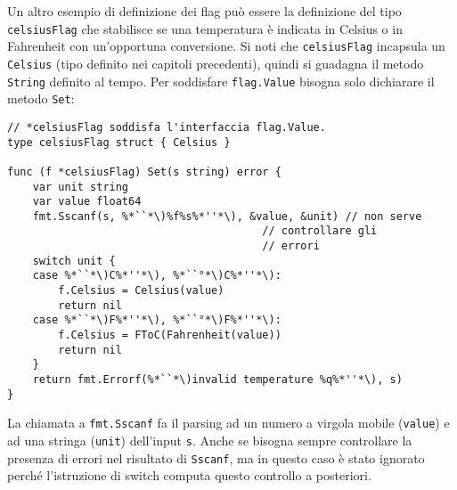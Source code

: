 Un altro esempio di definizione dei flag può essere la definizione del tipo \verb|celsiusFlag| che stabilisce se una temperatura è indicata in Celsius o in Fahrenheit con un'opportuna conversione.
Si noti che \verb|celsiusFlag| incapsula un \verb|Celsius| (tipo definito nei capitoli precedenti), quindi si guadagna il metodo \verb|String| definito al tempo.
Per soddisfare \verb|flag.Value| bisogna solo dichiarare il metodo \verb|Set|:
\begin{lstlisting}[frame=single, label={lst:lstlisting6-4.5}]
// *celsiusFlag soddisfa l'interfaccia flag.Value.
type celsiusFlag struct { Celsius }

func (f *celsiusFlag) Set(s string) error {
    var unit string
    var value float64
    fmt.Sscanf(s, %*``*\)%f%s%*''*\), &value, &unit) // non serve
                                        // controllare gli
                                        // errori
    switch unit {
    case %*``*\)C%*''*\), %*``°*\)C%*''*\):
        f.Celsius = Celsius(value)
        return nil
    case %*``*\)F%*''*\), %*``°*\)F%*''*\):
        f.Celsius = FToC(Fahrenheit(value))
        return nil
    }
    return fmt.Errorf(%*``*\)invalid temperature %q%*''*\), s)
}
\end{lstlisting}
La chiamata a \verb|fmt.Sscanf| fa il parsing ad un numero a virgola mobile (\verb|value|) e ad una stringa (\verb|unit|) dell'input \verb|s|.
Anche se bisogna sempre controllare la presenza di errori nel risultato di \verb|Sscanf|, ma in questo caso è stato ignorato perché l'istruzione di switch computa questo controllo a posteriori.


